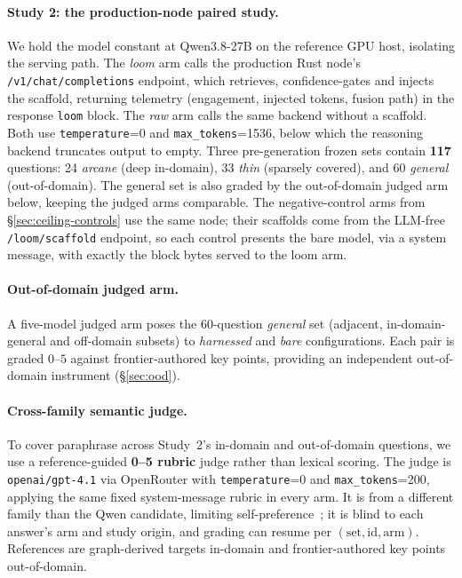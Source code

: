 \documentclass[10pt,twocolumn]{article}
\begin{document}
\paragraph{Study 2: the production-node paired study.} We hold the model constant at Qwen3.8-27B on the reference GPU host, isolating the serving path. The \emph{loom} arm calls the production Rust node's \texttt{/v1/chat/completions} endpoint, which retrieves, confidence-gates and injects the scaffold, returning telemetry (engagement, injected tokens, fusion path) in the response \texttt{loom} block. The \emph{raw} arm calls the same backend without a scaffold. Both use \texttt{temperature}=0 and \texttt{max\_tokens}=1536, below which the reasoning backend truncates output to empty. Three pre-generation frozen sets contain \textbf{117} questions: 24 \emph{arcane} (deep in-domain), 33 \emph{thin} (sparsely covered), and 60 \emph{general} (out-of-domain). The general set is also graded by the out-of-domain judged arm below, keeping the judged arms comparable. The negative-control arms from \S\ref{sec:ceiling-controls} use the same node; their scaffolds come from the LLM-free \texttt{/loom/scaffold} endpoint, so each control presents the bare model, via a system message, with exactly the block bytes served to the loom arm.

\paragraph{Out-of-domain judged arm.} A five-model judged arm poses the 60-question \emph{general} set (adjacent, in-domain-general and off-domain subsets) to \emph{harnessed} and \emph{bare} configurations. Each pair is graded $0$--$5$ against frontier-authored key points, providing an independent out-of-domain instrument (\S\ref{sec:ood}).

\paragraph{Cross-family semantic judge.} To cover paraphrase across Study~2's in-domain and out-of-domain questions, we use a reference-guided \textbf{0--5 rubric} judge rather than lexical scoring. The judge is \texttt{openai/gpt-4.1} via OpenRouter with \texttt{temperature}=0 and \texttt{max\_tokens}=200, applying the same fixed system-message rubric in every arm. It is from a different family than the Qwen candidate, limiting self-preference~\cite{zheng2023judging,panickssery2024selfpreference}; it is blind to each answer's arm and study origin, and grading can resume per $(\text{set},\text{id},\text{arm})$. References are graph-derived targets in-domain and frontier-authored key points out-of-domain.
\end{document}
